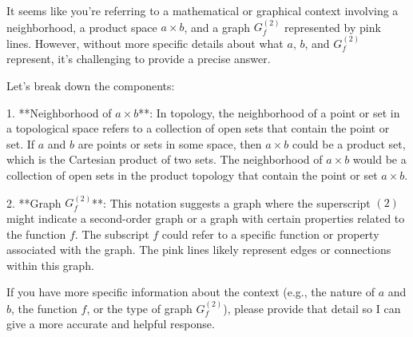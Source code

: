 It seems like you're referring to a mathematical or graphical context involving a neighborhood, a product space \(a \times b\), and a graph \(G^{(2)}_f\) represented by pink lines. However, without more specific details about what \(a\), \(b\), and \(G^{(2)}_f\) represent, it's challenging to provide a precise answer.

Let's break down the components:

1. **Neighborhood of \(a \times b\)**: In topology, the neighborhood of a point or set in a topological space refers to a collection of open sets that contain the point or set. If \(a\) and \(b\) are points or sets in some space, then \(a \times b\) could be a product set, which is the Cartesian product of two sets. The neighborhood of \(a \times b\) would be a collection of open sets in the product topology that contain the point or set \(a \times b\).

2. **Graph \(G^{(2)}_f\)**: This notation suggests a graph where the superscript \((2)\) might indicate a second-order graph or a graph with certain properties related to the function \(f\). The subscript \(f\) could refer to a specific function or property associated with the graph. The pink lines likely represent edges or connections within this graph.

If you have more specific information about the context (e.g., the nature of \(a\) and \(b\), the function \(f\), or the type of graph \(G^{(2)}_f\)), please provide that detail so I can give a more accurate and helpful response.